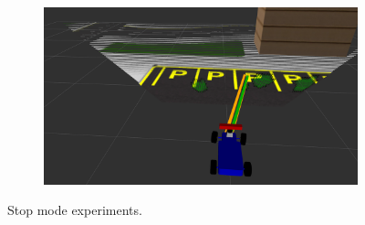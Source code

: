 \begin{figure}[h]
\begin{subfigure}[b]{0.45\linewidth}
  \end{subfigure}
  \begin{subfigure}[b]{0.45\linewidth}
    \includegraphics[width=\linewidth]{figures/experiments/parking-slot-pc.png}
  \end{subfigure}
  \caption{Stop mode experiments.}
  \label{figure:stop}
\end{figure}
